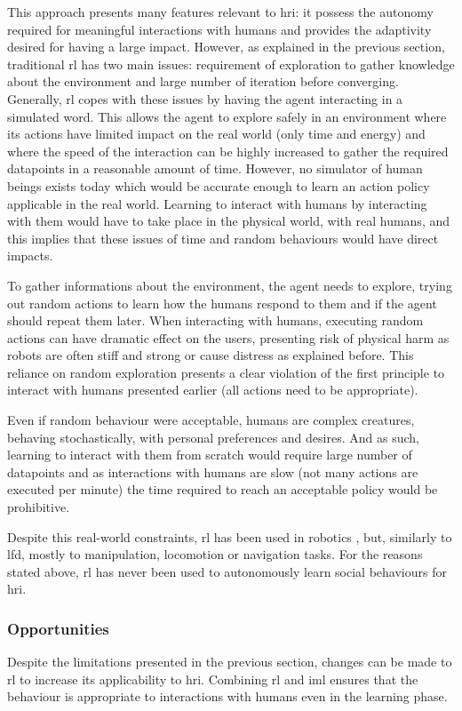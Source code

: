 	This approach presents many features relevant to \gls{hri}: it possess the autonomy required for meaningful interactions with humans and provides the adaptivity desired for having a large impact. However, as explained in the previous section, traditional \gls{rl} has two main issues: requirement of exploration to gather knowledge about the environment and large number of iteration before converging. Generally, \gls{rl} copes with these issues by having the agent interacting in a simulated word. This allows the agent to explore safely in an environment where its actions have limited impact on the real world (only time and energy) and where the speed of the interaction can be highly increased to gather the required datapoints in a reasonable amount of time. However, no simulator of human beings exists today which would be accurate enough to learn an action policy applicable in the real world. Learning to interact with humans by interacting with them would have to take place in the physical world, with real humans, and this implies that these issues of time and random behaviours would have direct impacts. 
	
	To gather informations about the environment, the agent needs to explore, trying out random actions to learn how the humans respond to them and if the agent should repeat them later. When interacting with humans, executing random actions can have dramatic effect on the users, presenting risk of physical harm as robots are often stiff and strong or cause distress as explained before. This reliance on random exploration presents a clear violation of the first principle to interact with humans presented earlier (all actions need to be appropriate).
	
	Even if random behaviour were acceptable, humans are complex creatures, behaving stochastically, with personal preferences and desires. And as such, learning to interact with them from scratch would require large number of datapoints and as interactions with humans are slow (not many actions are executed per minute) the time required to reach an acceptable policy would be prohibitive. 
	
	Despite this real-world constraints, \gls{rl} has been used in robotics \citep{kober2013reinforcement}, but, similarly to \gls{lfd}, mostly to manipulation, locomotion or navigation tasks. For the reasons stated above, \gls{rl} has never been used to autonomously learn social behaviours for \gls{hri}. 
	
	\subsubsection{Opportunities}  
	Despite the limitations presented in the previous section, changes can be made to \gls{rl} to increase its applicability to \gls{hri}. Combining \gls{rl} and \gls{iml} ensures that the behaviour is appropriate to interactions with humans even in the learning phase.
	
